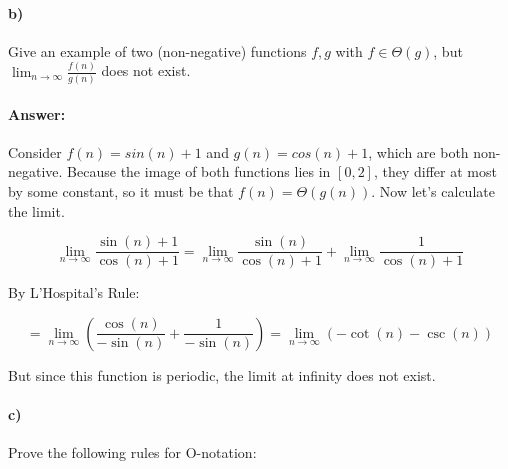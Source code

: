 \documentclass[a4paper]{article}
\begin{document}
\paragraph{b)} Give an example of two (non-negative) functions $f,g$ with $f \in \Theta(g)$, but $\lim_{n \rightarrow \infty}\frac{f(n)}{g(n)}$ does not exist. 

\paragraph{Answer:}

Consider $f(n) = sin(n) + 1$ and $g(n) = cos(n) + 1$, which are both non-negative. Because the image of both functions lies in $[0, 2]$, they differ at most by some constant, so it must be that $f(n) = \Theta(g(n))$.
Now let's calculate the limit.

$$\lim_{n \rightarrow \infty} \frac{\sin(n) + 1}{\cos(n) + 1} = 
\lim_{n \rightarrow \infty} \frac{\sin(n)}{\cos(n) + 1} + \lim_{n \rightarrow \infty} \frac{1}{\cos(n) + 1}$$

By L'Hospital's Rule:

 
$$= \lim_{n \rightarrow \infty} \left ( \frac{\cos(n)}{-\sin(n)} + \frac{1}{-\sin(n)} \right )= \lim_{n \rightarrow \infty} \left (- \cot (n) - \csc (n) \right )$$

But since this function is periodic, the limit at infinity does not exist.

\paragraph{c)} Prove the following rules for O-notation:
\end{document}
